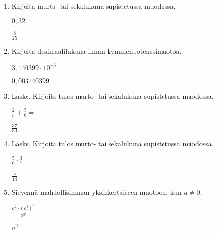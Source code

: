 \documentclass[finnish, a4paper, 12pt]{article}
\begin{document}
	\begin{enumerate}[leftmargin=*]
		\setlength\itemsep{1em}
		
		\item %
		Kirjoita murto- tai sekalukuna supistetussa muodossa. 
		
		\(
		0{,}32 = 
		\) %
		
		\begin{version:withAnswers}
		\( \frac{8}{25} \)
		\end{version:withAnswers}

		\vspace{8pt}
		
		\item %
		Kirjoita desimaalilukuna ilman kymmenpotenssimuotoa. 
		
		\(
		3{,}140399\cdot 10^{-3} = 
		\) %
		\begin{version:withAnswers}
		\( 0,003140399 \)
		\end{version:withAnswers}	
		\vspace{8pt}
		
		\item %
		Laske. Kirjoita tulos murto- tai sekalukuna supistetussa muodossa.
		
		\(
		\displaystyle
		\frac{2}{5}+\frac{5}{6} = 
		\) %
		\begin{version:withAnswers}
		\( \frac{37}{30} \)
		\end{version:withAnswers}	
		
		\vspace{8pt}
		
		\item %
		Laske. Kirjoita tulos murto- tai sekalukuna supistetussa muodossa.
		
		\(
		\displaystyle
		\frac{5}{6}\cdot\frac{3}{7} = 
		\) %
		\begin{version:withAnswers}
		\( \frac{5}{14} \)
		\end{version:withAnswers}
		
		\vspace{8pt}
		
		\item %
		Sievennä mahdollisimman yksinkertaiseen muotoon, kun \(a \not = 0\). 
		
		\(
		\displaystyle
		\frac{a^2 \cdot \left(a^3\right)^3}{a^{3^2}} =
		\phantom{mmmmmmmmmmmmmmm}
		\) %
		\begin{version:withAnswers}
		\(  a^{2} \)
		\end{version:withAnswers}
		

\end{enumerate}
\end{document}
